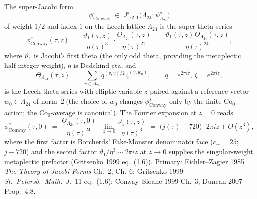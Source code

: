 \begin{definition}
\label{def:bkm-phi-super-conway}
The super-Jacobi form
\[
 \phi^{s}_{\mathrm{Conway}}\;\in\;J^{s}_{1/2,1}\bigl(\Lambda_{24};
 \psi^{s}_{\Lambda_{24}}\bigr)
\]
of weight $1/2$ and index $1$ on the Leech lattice $\Lambda_{24}$
is the super-theta series
\[
 \phi^{s}_{\mathrm{Conway}}(\tau,z)
 \;=\;\frac{\vartheta_{1}(\tau,z)}{\eta(\tau)^{3}}\cdot
 \frac{\Theta_{\Lambda_{24}}(\tau,z)}{\eta(\tau)^{21}}
 \;=\;\frac{\vartheta_{1}(\tau,z)\,\Theta_{\Lambda_{24}}(\tau,z)}{\eta(\tau)^{24}},
\]
where $\vartheta_{1}$ is Jacobi's first theta (the only odd theta,
providing the metaplectic half-integer weight), $\eta$ is Dedekind
eta, and
\[
 \Theta_{\Lambda_{24}}(\tau,z)
 \;=\;\sum_{v\in\Lambda_{24}}
 q^{(v,v)/2}\,\zeta^{(v,w_{0})},\qquad q = e^{2\pi i\tau},\;
 \zeta = e^{2\pi iz},
\]
is the Leech theta series with elliptic variable $z$ paired against
a reference vector $w_{0}\in\Lambda_{24}$ of norm~$2$ (the choice
of $w_{0}$ changes $\phi^{s}_{\mathrm{Conway}}$ only by the finite
$\mathrm{Co}_{0}$-action; the $\mathrm{Co}_{0}$-average is
canonical). The Fourier expansion at $z = 0$ reads
\[
 \phi^{s}_{\mathrm{Conway}}(\tau,0)
 \;=\;\frac{\Theta_{\Lambda_{24}}(\tau,0)}{\eta(\tau)^{24}}\cdot
 \lim_{z\to 0}\frac{\vartheta_{1}(\tau,z)}{\eta(\tau)^{3}}
 \;=\;\bigl(j(\tau) - 720\bigr)\cdot 2\pi iz + O(z^{3}),
\]
where the first factor is Borcherds' Fake-Monster denominator face
($c_{+} = 25$; $j - 720$) and the second factor
$\vartheta_{1}/\eta^{3}\sim 2\pi iz$ at $z\to 0$ supplies the
singular-weight metaplectic prefactor (Gritsenko 1999 eq.~(1.6)).
Primary: Eichler--Zagier 1985 \emph{The Theory of Jacobi Forms}
Ch.~2, Ch.~6; Gritsenko 1999 \emph{St.\ Petersb.\ Math.\ J.}~11
eq.~(1.6); Conway--Sloane 1999 Ch.~3; Duncan 2007 Prop.~4.8.
\end{definition}

